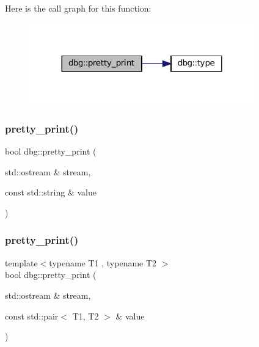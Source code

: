 Here is the call graph for this function\+:
\nopagebreak
\begin{figure}[H]
\begin{center}
\leavevmode
\includegraphics[width=276pt]{namespacedbg_acd3034b7476cdf474e46eb2bbca6e0d1_cgraph}
\end{center}
\end{figure}
\mbox{\label{namespacedbg_ae620aa6031e088dc11e1df853e38f5fa}} 
\subsubsection{\texorpdfstring{pretty\+\_\+print()}{pretty\_print()}\hspace{0.1cm}{\footnotesize\ttfamily [18/19]}}
{\footnotesize\ttfamily bool dbg\+::pretty\+\_\+print (\begin{DoxyParamCaption}\item[{std\+::ostream \&}]{stream,  }\item[{const std\+::string \&}]{value }\end{DoxyParamCaption})\hspace{0.3cm}{\ttfamily [inline]}}

\mbox{\label{namespacedbg_adf02078069da78815c208dd638a01640}} 
\subsubsection{\texorpdfstring{pretty\+\_\+print()}{pretty\_print()}\hspace{0.1cm}{\footnotesize\ttfamily [19/19]}}
{\footnotesize\ttfamily template$<$typename T1 , typename T2 $>$ \\
bool dbg\+::pretty\+\_\+print (\begin{DoxyParamCaption}\item[{std\+::ostream \&}]{stream,  }\item[{const std\+::pair$<$ T1, T2 $>$ \&}]{value }\end{DoxyParamCaption})\hspace{0.3cm}{\ttfamily [inline]}}

